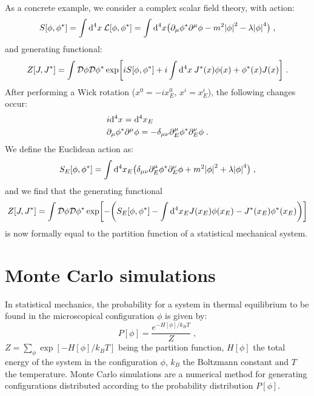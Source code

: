 As a concrete example, we consider a complex scalar field theory, with action:
\begin{equation}
S[\phi,\phi^*] = \int \mathrm{d}^4x \: \mathcal L[\phi,\phi^*] = \int \mathrm{d}^4x \bigl( \partial_{\mu} \phi^* \partial^{\mu} \phi - m^2 \abs{\phi}^2 -\lambda \abs{\phi}^4 \bigr) \; ,
\end{equation}
%
and generating functional:
\begin{equation}
Z[J,J^*] = \int \mathcal D \phi \mathcal D \phi^* \exp \biggl[ i S[\phi,\phi^*] + i \int \mathrm{d}^4x \: J^*(x) \phi(x) + \phi^*(x) J(x) \biggr] \; .
\label{scalar_gen_functional}
\end{equation}
%
After performing a Wick rotation ($x^0 = -i x^0_E$, $x^i = x^i_E$), the following changes occur:
\begin{equation}
\begin{split}
& i\mathrm{d}^4x =  \mathrm{d}^4x_E \\
& \partial_{\mu} \phi^* \partial^{\mu} \phi = - \delta_{\mu\nu} \partial^{\mu}_E \phi^* \partial^{\nu}_E \phi \; .
\end{split}
\end{equation}
%
We define the Euclidean action as:
\begin{equation}
S_E[\phi,\phi^*] = \int \mathrm{d}^4x_E \bigl( \delta_{\mu\nu} \partial^{\mu}_E \phi^* \partial^{\nu}_E \phi + m^2 \abs{\phi}^2 + \lambda \abs{\phi}^4  \bigr) \; ,
\end{equation}
%
and we find that the generating functional
\begin{equation}
Z[J,J^*] = \int \mathcal D \phi \mathcal D \phi^* \exp \biggl[ - \biggl( S_E[\phi,\phi^*] - \int \mathrm{d}^4x_E J(x_E) \phi(x_E) - J^*(x_E) \phi^*(x_E) \biggr) \biggr] 
\end{equation}
%
is now formally equal to the partition function of a statistical mechanical system.


\section{Monte Carlo simulations}

In statistical mechanics, the probability for a system in thermal equilibrium to be found in the microscopical configuration $\phi$ is given by:
\begin{equation}
P[\phi] = \frac{e^{-H[\phi]/k_B T}}{Z} \; ,
\end{equation}
%
$Z=\sum_{\phi} \exp[-H[\phi]/k_B T]$ being the partition function, $H[\phi]$ the total energy of the system in the configuration $\phi$, $k_B$ the Boltzmann constant and $T$ the temperature. Monte Carlo simulations are a numerical method for generating configurations distributed according to the probability distribution $P[\phi]$.

